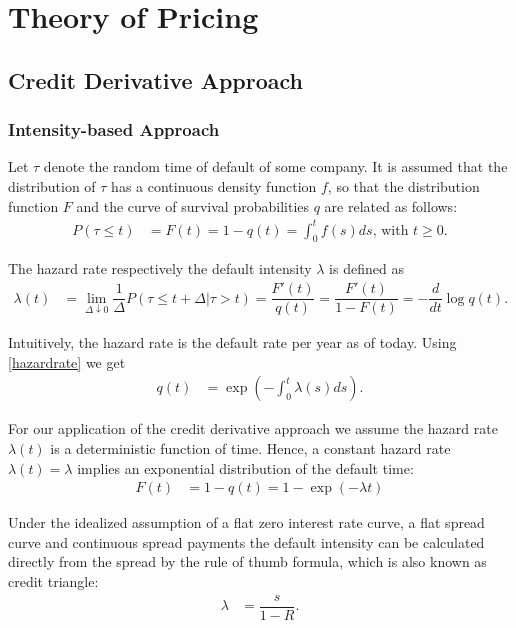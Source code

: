 \chapter{Theory of Pricing}

\section{Credit Derivative Approach}

\subsection{Intensity-based Approach}
Let $\tau$ denote the random time of default of some company. It is assumed that the distribution of $\tau$ has a continuous density function $f$, so that the distribution function $F$ and the curve of survival probabilities $q$ are related as follows:  
\begin{align}
P(\tau \leq t) &= F(t) = 1 - q(t) = \int_0^t f(s) ds \text{, with } t \geq 0.
\end{align}

The hazard rate respectively the default intensity $\lambda$ is defined as
\begin{align} \label{hazardrate}
\lambda(t) &= \lim_{\Delta \downarrow 0} \dfrac{1}{\Delta} P(\tau \leq t + \Delta | \tau > t) = \dfrac{F'(t)}{q(t)} = \dfrac{F'(t)}{1 - F(t)} = - \dfrac{d}{dt} \log q(t).
\end{align}

Intuitively, the hazard rate is the default rate per year as of today. Using \ref{hazardrate} we get
\begin{align}
q(t) &= \exp \left(- \int_0^t \lambda (s) ds \right).
\end{align}

For our application of the credit derivative approach \citep{de2011pricing} we assume the hazard rate $\lambda(t)$ is a deterministic function of time. Hence, a constant hazard rate $\lambda(t) = \lambda$ implies an exponential distribution of the default time:
\begin{align}
F(t) &=  1 - q(t) = 1 - \exp (- \lambda t)
\end{align}

Under the idealized assumption of a flat zero interest rate curve, a flat spread curve and continuous spread payments the default intensity can be calculated directly from the spread by the rule of thumb formula, which is also known as credit triangle: 
\begin{align}
\lambda &= \dfrac{s}{1-R}.
\end{align}

